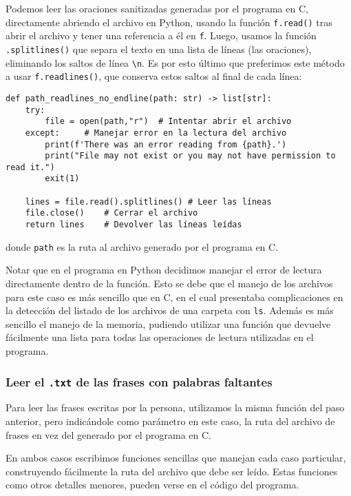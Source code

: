 \documentclass[a4paper]{article}
\begin{document}
Podemos leer las oraciones sanitizadas generadas por el programa en C, directamente abriendo el archivo en Python, usando la función \texttt{f.read()} tras abrir el archivo y tener una referencia a él en \texttt{f}. Luego, usamos la función \texttt{.splitlines()} que separa el texto en una lista de líneas (las oraciones), eliminando los saltos de línea \texttt{\textbackslash{}n}. Es por esto último que preferimos este método a usar \texttt{f.readlines()}, que conserva estos saltos al final de cada línea:
\begin{verbatim}
def path_readlines_no_endline(path: str) -> list[str]:
    try:
        file = open(path,"r")  # Intentar abrir el archivo
    except:     # Manejar error en la lectura del archivo
        print(f'There was an error reading from {path}.')
        print("File may not exist or you may not have permission to read it.")
        exit(1)

    lines = file.read().splitlines() # Leer las líneas
    file.close()    # Cerrar el archivo
    return lines    # Devolver las líneas leídas
\end{verbatim}
\noindent donde \texttt{path} es la ruta al archivo generado por el programa en C.

Notar que en el programa en Python decidimos manejar el error de lectura directamente dentro de la función. Esto se debe que el manejo de los archivos para este caso es más sencillo que en C, en el cual presentaba complicaciones en la detección del listado de los archivos de una carpeta con \texttt{ls}. Además es más sencillo el manejo de la memoria, pudiendo utilizar una función que devuelve fácilmente una lista para todas las operaciones de lectura utilizadas en el programa.

\subsubsection{Leer el \texttt{.txt} de las frases con palabras faltantes}

Para leer las frases escritas por la persona, utilizamos la misma función del paso anterior, pero indicándole como parámetro en este caso, la ruta del archivo de frases en vez del generado por el programa en C.

En ambos casos escribimos funciones sencillas que manejan cada caso particular, construyendo fácilmente la ruta del archivo que debe ser leído. Estas funciones como otros detalles menores, pueden verse en el código del programa.
\end{document}
